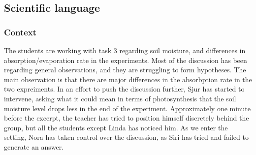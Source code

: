 \subsection{Scientific language}
\subsubsection*{Context}
The students are working with task 3 regarding soil moisture, and differences in absorption/evaporation rate in the experiments. Most of the discussion has been regarding general observations, and they are struggling to form hypotheses. The main observation is that there are major differences in the absorbption rate in the two expreiments. In an effort to push the discussion further, Sjur has started to intervene, asking what it could mean in terms of photosynthesis that the soil moisture level drops less in the end of the experiment. Approximately one minute before the excerpt, the teacher has tried to position himself discretely behind the group, but all the students except Linda has noticed him. As we enter the setting, Nora has taken control over the discussion, as Siri has tried and failed to generate an answer. 

